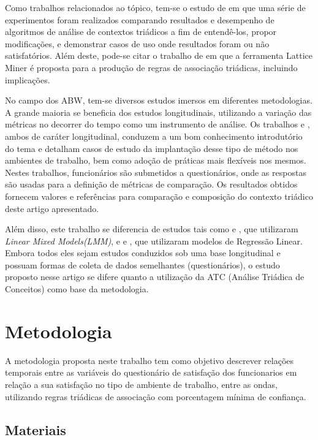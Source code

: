 \documentclass[kdmile,a4paper]{kdmile} %
\begin{document}
Como trabalhos relacionados ao tópico, tem-se  o estudo de \cite{article} em que uma série de experimentos foram realizados comparando resultados e desempenho de algoritmos de análise de contextos triádicos a fim de entendê-los, propor modificações, e demonstrar casos de uso onde resultados foram ou não satisfatórios. Além deste, pode-se citar o trabalho de \cite{missaoui2017lattice} em que a ferramenta Lattice Miner é proposta para a produção de regras de associação triádicas, incluindo implicações.  

No campo dos ABW, tem-se diversos estudos imersos em diferentes metodologias. A grande maioria  se beneficia dos estudos longitudinais, utilizando a variação das métricas no decorrer do tempo como um instrumento de análise. Os trabalhos \cite{doi:10.1080/00140139.2017.1398844} e \cite{Work}, ambos de caráter longitudinal, conduzem a um bom conhecimento introdutório do tema e detalham casos de estudo da implantação desse tipo de método nos ambientes de trabalho, bem como adoção de práticas mais flexíveis nos mesmos. Nestes trabalhos, funcionários são submetidos a questionários, onde as respostas são usadas para a definição de métricas de comparação. Os resultados obtidos fornecem valores e referências para comparação e composição do contexto triádico deste artigo apresentado.

Além disso, este trabalho se diferencia de estudos tais como \cite{Arundell} e \cite{Mixed}, que utilizaram \textit{Linear Mixed Models(LMM)}, e \cite{Annu} e \cite{cubic}, que utilizaram modelos de Regressão Linear. Embora todos eles sejam estudos conduzidos sob uma base longitudinal e possuam formas de coleta de dados semelhantes (questionários), o estudo proposto nesse artigo se difere quanto a utilização da ATC (Análise Triádica de Conceitos) como base da metodologia.

\section{Metodologia}

A metodologia proposta neste trabalho tem como objetivo descrever relações temporais entre as variáveis do questionário de satisfação dos funcionarios em relação a sua satisfação no tipo de ambiente de trabalho, entre as ondas, utilizando regras triádicas de associação com porcentagem mínima de confiança.

\subsection{Materiais}
\end{document}
